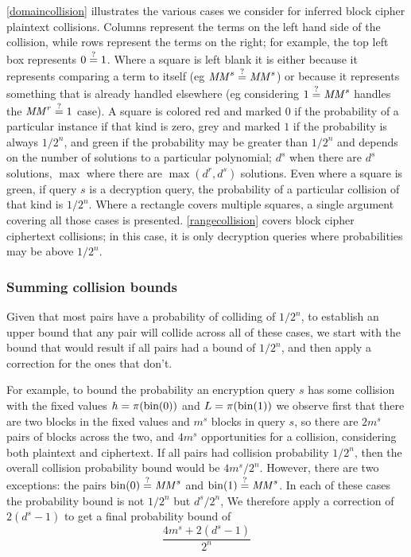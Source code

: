 \documentclass[hctr.tex]{subfiles}
\begin{document}
\autoref{domaincollision} illustrates the various cases
we consider for inferred block cipher plaintext collisions.
Columns represent the terms
on the left hand side of the collision, while
rows represent the terms on the right; 
for example, the top left box represents
\(0 \stackrel{\text{?}}{=} 1\). Where a square is left blank
it is either because it represents
comparing a term to itself (eg \(\mathit{MM}^s \stackrel{\text{?}}{=} \mathit{MM}^s\))
or because it represents something that
is already handled elsewhere
(eg considering \(1 \stackrel{\text{?}}{=} \mathit{MM}^s\)
handles the \(\mathit{MM}^r \stackrel{\text{?}}{=} 1\) case).
A square is colored red
and marked \(0\) if the
probability of a particular instance
if that kind is zero, grey
and marked \(1\) if
the probability is always \(1/2^n\),
and green if the probability may be
greater than \(1/2^n\) and depends
on the number of solutions to a
particular polynomial;
\(d^s\) when there are \(d^s\) solutions,
\(\max\) where there are
\(\max(d^r, d^s)\) solutions.
Even where a square is green,
if query \(s\) is a decryption query,
the probability of a particular collision of
that kind is \(1/2^n\).
Where a rectangle covers
multiple squares, a single argument
covering all those cases is presented.
\autoref{rangecollision} covers
block cipher ciphertext collisions; in this case,
it is only decryption queries where
probabilities may be above \(1/2^n\).


\subsubsection{Summing collision bounds}
Given that most pairs have a probability of
colliding of \(1/2^n\), 
to establish an upper bound that any pair
will collide across all of these cases,
we start with the bound that would result
if all pairs had a bound of \(1/2^n\),
and then apply a correction for the ones that don't.

For example,
to bound the probability an encryption query \(s\)
has some collision with the fixed values
\(h = \pi(\operatorname{bin}(0))\) and \(L = \pi(\operatorname{bin}(1))\)
we observe first that
there are two blocks in the fixed values
and \(m^s\) blocks in query \(s\), so there are
\(2m^s\) pairs of blocks across the two,
and \(4m^s\) opportunities for a collision, 
considering both plaintext and ciphertext.
If all pairs had collision probability \(1/2^n\),
then the overall collision probability bound
would be \(4m^s/2^n\). However, there are
two exceptions: the pairs
\(\operatorname{bin}(0) \stackrel{\text{?}}{=} \mathit{MM}^s\) and
\(\operatorname{bin}(1) \stackrel{\text{?}}{=} \mathit{MM}^s\). In each of these
cases the probability bound is not \(1/2^n\) but
\(d^s/2^n\), We therefore apply a correction
of \(2(d^s - 1)\) to get a final probability bound of
\begin{displaymath}
    \frac{4m^s + 2(d^s - 1)}{2^n}
\end{displaymath}
\end{document}
